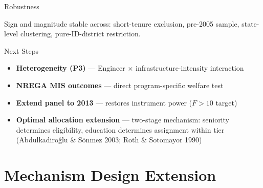 \documentclass[aspectratio=169]{beamer}
\begin{document}
\begin{frame}{Robustness}
\begin{center}
\end{center}
\vspace{4pt}
{\footnotesize \color{gray}
Sign and magnitude stable across: short-tenure exclusion, pre-2005 sample, state-level clustering, pure-ID-district restriction.}
\end{frame}

\begin{frame}{Next Steps}

\begin{itemize}\setlength\itemsep{14pt}
  \item \textbf{Heterogeneity (P3)} ---
        Engineer $\times$ infrastructure-intensity interaction

  \item \textbf{NREGA MIS outcomes} ---
        direct program-specific welfare test

  \item \textbf{Extend panel to 2013} ---
        restores instrument power ($F > 10$ target)

  \item \textbf{Optimal allocation extension} ---
        two-stage mechanism: seniority determines eligibility,
        education determines assignment within tier
        {\small (Abdulkadiro\u{g}lu \& S\"onmez 2003;
        Roth \& Sotomayor 1990)}
\end{itemize}

\end{frame}

\section{Mechanism Design Extension}
\end{document}
